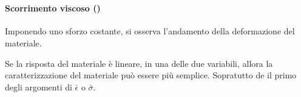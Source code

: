 \begin{figure}
\centering
{}\quad
{}\\
\quad
{}
\end{figure}

\paragraph{Scorrimento viscoso ()}
Imponendo uno sforzo costante, si osserva l'andamento della deformazione del materiale.

Se la risposta del materiale è lineare, in una delle due variabili, allora la caratterizzazione del materiale può essere più semplice. Sopratutto de il primo degli argomenti di $\bar{\epsilon}$ o $\bar{\sigma}$.

